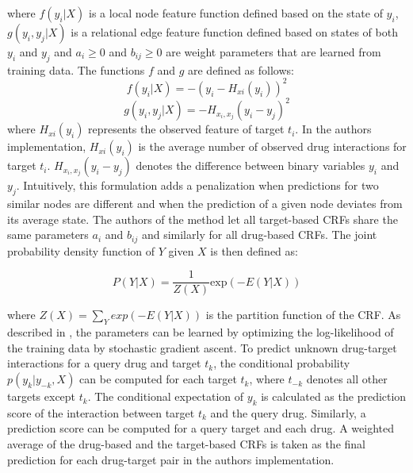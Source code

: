 where $f(y_i|X)$ is a local node feature function defined based on the state of $y_i$, $g(y_i, y_j | X)$ is a relational edge feature function defined based on states of both $y_i$ and $y_j$ and $a_i\geq 0$ and $b_{ij} \geq 0$ are weight parameters that are learned from training data. The functions $f$ and $g$ are defined as follows:
\begin{equation}
f(y_i|X) = -(y_i - H_{xi}(y_i))^2
\end{equation}
\begin{equation}
g(y_i,y_j | X) = -H_{x_i,x_j}(y_i-y_j)^2
\end{equation}
where $H_{xi}(y_i)$ represents the observed feature of target $t_i$. In the authors implementation, $H_{xi}(y_i)$ is the average number of observed drug interactions for target $t_i$. $H_{x_i,x_j}(y_i-y_j)$ denotes the difference between binary variables $y_i$ and $y_j$. Intuitively, this formulation adds a penalization when predictions for two similar nodes are different and when the prediction of a given node deviates from its average state.
The authors of the method let all target-based CRFs share the same parameters $a_i$ and $b_{ij}$ and similarly for all drug-based CRFs. The joint probability density function of $Y$ given $X$ is then defined as:

\begin{equation}
P(Y|X) = \frac{1}{Z(X)}\text{exp}(-E(Y|X))
\end{equation}

where $Z(X)=\sum\limits_{Y}exp(-E(Y|X))$ is the partition function of the CRF. As described in \cite{yang2014drug}, the parameters can be learned by optimizing the log-likelihood of the training data by stochastic gradient ascent. To predict unknown drug-target interactions for a query drug and target $t_k$, the conditional probability $p(y_k|y_{-k},X)$ can be computed for each target $t_k$, where $t_{-k}$ denotes all other targets except $t_k$. The conditional expectation of $y_k$ is calculated as the prediction score of the interaction between target $t_k$ and the query drug. Similarly, a prediction score can be computed for a query target and each drug. A weighted average of the drug-based and the target-based CRFs is taken as the final prediction for each drug-target pair in the authors implementation.




